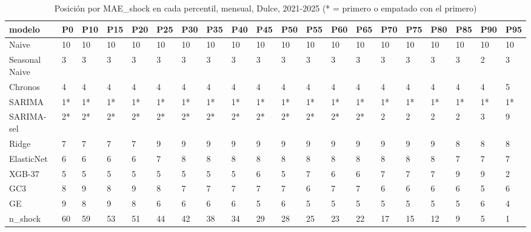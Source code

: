 \begin{table}[H]
\centering
\small
\caption{Posición por MAE\_shock en cada percentil, mensual, Dulce, 2021-2025 (* = primero o empatado con el primero)}
\label{tab:T_barrido_posiciones_mensual_dulce}
\begin{tabular}{llllllllllllllllllll}
\toprule
modelo & P0 & P10 & P15 & P20 & P25 & P30 & P35 & P40 & P45 & P50 & P55 & P60 & P65 & P70 & P75 & P80 & P85 & P90 & P95 \\
\midrule
Naive & 10 & 10 & 10 & 10 & 10 & 10 & 10 & 10 & 10 & 10 & 10 & 10 & 10 & 10 & 10 & 10 & 10 & 10 & 10 \\
Seasonal Naive & 3 & 3 & 3 & 3 & 3 & 3 & 3 & 3 & 3 & 3 & 3 & 3 & 3 & 3 & 3 & 3 & 3 & 2 & 3 \\
Chronos & 4 & 4 & 4 & 4 & 4 & 4 & 4 & 4 & 4 & 4 & 4 & 4 & 4 & 4 & 4 & 4 & 4 & 4 & 5 \\
SARIMA & 1* & 1* & 1* & 1* & 1* & 1* & 1* & 1* & 1* & 1* & 1* & 1* & 1* & 1* & 1* & 1* & 1* & 1* & 1* \\
SARIMA-sel & 2* & 2* & 2* & 2* & 2* & 2* & 2* & 2* & 2* & 2* & 2* & 2* & 2* & 2 & 2 & 2 & 2 & 3 & 9 \\
Ridge & 7 & 7 & 7 & 7 & 9 & 9 & 9 & 9 & 9 & 9 & 9 & 9 & 9 & 9 & 9 & 9 & 8 & 8 & 8 \\
ElasticNet & 6 & 6 & 6 & 6 & 7 & 8 & 8 & 8 & 8 & 8 & 8 & 8 & 8 & 8 & 8 & 8 & 7 & 7 & 7 \\
XGB-37 & 5 & 5 & 5 & 5 & 5 & 5 & 5 & 5 & 6 & 5 & 7 & 6 & 6 & 7 & 7 & 7 & 9 & 9 & 2 \\
GC3 & 8 & 9 & 8 & 9 & 8 & 7 & 7 & 7 & 7 & 7 & 6 & 7 & 7 & 6 & 6 & 6 & 6 & 5 & 6 \\
GE & 9 & 8 & 9 & 8 & 6 & 6 & 6 & 6 & 5 & 6 & 5 & 5 & 5 & 5 & 5 & 5 & 5 & 6 & 4 \\
n\_shock & 60 & 59 & 53 & 51 & 44 & 42 & 38 & 34 & 29 & 28 & 25 & 23 & 22 & 17 & 15 & 12 & 9 & 5 & 1 \\
\bottomrule
\end{tabular}
\end{table}